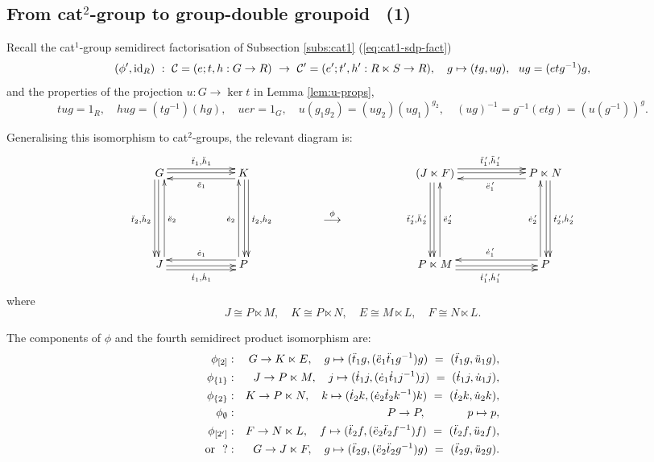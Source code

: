 \newpage
\subsection{From cat$^2$-group to group-double groupoid ~(1)}

Recall the cat$^1$-group semidirect factorisation of 
Subsection \ref{subs:cat1} (\ref{eq:cat1-sdp-fact})
$$
(\phi',\mathrm{id}_R) ~:~ \mathcal{C} = (e;t,h : G \to R) 
                ~\to~ \mathcal{C}' = (e';t',h' : R \ltimes S \to R),
                \quad g \mapsto (tg,ug),~~ ug = (etg^{-1})g, 
$$
and the properties of the projection $u : G \to \ker t$ 
in Lemma \ref{lem:u-props},
$$
tug = 1_R, \quad
hug = (tg^{-1})(hg), \quad 
uer = 1_G, \quad
u(g_1g_2) = (ug_2)(ug_1)^{g_2}, \quad
(ug)^{-1} = g^{-1}(etg) = (u(g^{-1}))^g.
$$

\noindent
Generalising this isomorphism to cat$^2$-groups, the relevant diagram is: 
$$
\xymatrix @C=5.0pc @R=2.0pc{
G \ar[r]<1.0ex>^{\ddtto,\ddhho} \ar[r]<0.2ex> 
  \ar[dd]<-1.0ex>_{\ddttt,\ddhht} \ar[dd]<-0.2ex> 
  & K \ar[dd]<1.0ex>^{\dttt,\dhht} \ar[dd]<0.2ex> 
      \ar[l]<1.0ex>^{\ddeeo}
    & & (J \ltimes F) 
        \ar[r]<1.0ex>^{{\ddtto}^{\,\prime},{\ddhho}^{\,\prime}} 
        \ar[r]<0.2ex>
        \ar[dd]<-1.0ex>_{{\ddttt}^{\,\prime},{\ddhht}^{\,\prime}} 
        \ar[dd]<-0.2ex>
        & P \ltimes N  \ar[l]<1.0ex>^{{\ddeeo}^{\,\prime}} 
                       \ar[dd]<1.0ex>^{{\dttt}^{\,\prime},{\dhht}^{\,\prime}} 
                       \ar[dd]<0.2ex>\\
  & & \stackrel{\phi}{\longrightarrow} 
      & & \\
J \ar[r]<-1.0ex>_{\dtto,\dhho} \ar[r]<-0.2ex>
  \ar[uu]<-1.0ex>_{\ddeet} 
  & P \ar[l]<-1.0ex>_{\deeo} \ar[uu]<1.0ex>^{\deet} 
    & & P \ltimes M \ar[r]<-1.0ex>_{{\dtto}^{\,\prime},{\dhho}^{\,\prime}} 
                    \ar[r]<-0.2ex>
                    \ar[uu]<-1.0ex>_{{\ddeet}^{\,\prime}}
        & P \ar[l]<-1.0ex>_{{\deeo}^{\,\prime}}  
            \ar[uu]<1.0ex>^{{\deet}^{\,\prime}}
}
$$
where
$$
J \cong P \ltimes M, \quad
K \cong P \ltimes N, \quad
E \cong M \ltimes L, \quad
F \cong N \ltimes L.
$$

\noindent
The components of $\phi$ and the fourth semidirect product isomorphism are: 
\begin{eqnarray*}
\phi_{[2]} &:& G \to K \ltimes E, \quad
  g \mapsto (\ddtto g, (\ddeeo\ddtto g^{-1})g) ~=~ (\ddtto g, \dduuo g),\\
\phi_{\{1\}} &:& J \to P \ltimes M, \quad
  j \mapsto (\dtto j, (\deeo\dtto j^{-1})j) ~=~ (\dtto j, \duuo j),\\
\phi_{\{2\}} &:& K \to P \ltimes N, \quad
  k \mapsto (\dttt k, (\deet\dttt k^{-1})k) ~=~ (\dttt k, \duut k),\\
\phi_{\emptyset} &:& P \to P, \hspace{13mm} p \mapsto p,\\
\phi_{[2']} &:& F \to N \ltimes L, \quad
  f \mapsto (\ddttt f, (\ddeet\ddttt f^{-1})f) ~=~ (\ddttt f, \dduut f),\\
\mbox{or}~~ ? &:& G \to J \ltimes F, \quad
  g \mapsto (\ddttt g, (\ddeet\ddttt g^{-1})g) ~=~ (\ddttt g, \dduut g).
\end{eqnarray*}

